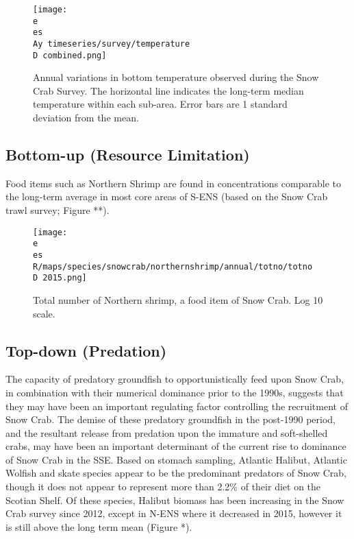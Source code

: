 \documentclass[paper=a4, fontsize=11pt]{article}
\newcommand{\D}{.}
\newcommand{\e}{/home/michelle/ecomod_data/}
\newcommand{\es}{snowcrab/}
\newcommand{\Ay}{assessments/2015/}
\begin{document}
\begin{figure}[h]
    \centering
    \texttt{[image: \\e \\es \\Ay timeseries/survey/temperature\\D combined.png]}
    \caption{Annual variations in bottom temperature observed during the Snow Crab Survey. The horizontal line indicates the long-term median temperature within each sub-area. Error bars are 1 standard deviation from the mean.}
\end{figure}


\subsection{Bottom-up (Resource Limitation)}

Food items such as Northern Shrimp are found in concentrations comparable to the long-term average in most core areas of S-ENS (based on the Snow Crab trawl survey; Figure **).

\begin{figure}[h]
  \centering
     \texttt{[image: \\e \\es R/maps/species/snowcrab/northernshrimp/annual/totno/totno\\D 2015.png]}
    \caption{Total number of Northern shrimp, a food item of Snow Crab. Log 10 scale.}
\end{figure}

\subsection{Top-down (Predation)}
The capacity of predatory groundfish to opportunistically feed upon Snow Crab, in combination with their numerical dominance prior to the 1990s, suggests that they may have been an important regulating factor controlling the recruitment of Snow Crab. The demise of these predatory groundfish in the post-1990 period, and the resultant release from predation upon the immature and soft-shelled crabs, may have been an important determinant of the current rise to dominance of Snow Crab in the SSE. Based on stomach sampling, Atlantic Halibut, Atlantic Wolfish and skate species appear to be the predominant predators of Snow Crab, though it does not appear to represent more than 2.2\% of their diet on the Scotian Shelf. Of these species, Halibut biomass has been increasing in the Snow Crab survey since 2012, except in N-ENS where it decreased in 2015, however it is still above the long term mean (Figure *). 
\end{document}
